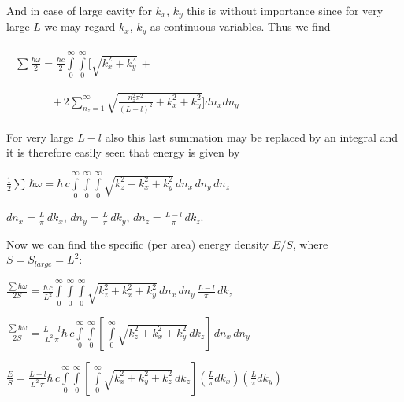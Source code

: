 \documentclass[twoside, 10pt]{article}
\begin{document}
\begin{multicols}{2}
    And in case of large cavity for \(k_x\), \(k_y\) this is without
importance since for very large \(L\) we may regard \(k_x\), \(k_y\) as
continuous variables. Thus we find

\(\begin{array}{l}
\begin{array}{ll}
\sum\frac{\hbar\omega}{2} = \frac{\hbar c}{2}\int\limits_{0}^{\infty}\int\limits_{0}^{\infty}\Bigg[\sqrt{k_x^2+k_y^2}\,+ & \,\\
\end{array} \\
\begin{array}{rr}
\,\,\,\,\,\,\,\,\,\,\,\,\,\,\,\, &+\, 2\sum\limits_{n_z=1}^{\infty}\sqrt{\frac{n_z^2 \pi^2}{(L-l)^2}+k_x^2+k_y^2}\Bigg]d{n_x}d{n_y}\end{array}
\end{array}\)


For very large \(L-l\) also this last summation may be replaced by an
integral and it is therefore easily seen that energy is given by

\(\frac{1}{2}\sum\,\hbar\omega = \hbar\,c\int\limits_{0}^{\infty}\int\limits_{0}^{\infty}\int\limits_{0}^{\infty}\sqrt{k_z^2+k_x^2+k_y^2}\,d{n_x}\,d{n_y}\,d{n_z}\)

\(dn_x = \frac{L}{\pi}\,dk_x\), \(dn_y = \frac{L}{\pi}\,dk_y\),
\(dn_z = \frac{L-l}{\pi}\,dk_z\).

    Now we can find the specific (per area) energy density \(E/S\), where
\(S = S_{large} = L^2\):

\(\frac{\sum\hbar\omega}{2 S} = \frac{\hbar\,c}{L^2}\int\limits_{0}^{\infty}\int\limits_{0}^{\infty}\int\limits_{0}^{\infty}\sqrt{k_z^2+k_x^2+k_y^2}\,dn_x\,dn_y\,\frac{L-l}{\pi}\,dk_z\)

\(\frac{\sum\hbar\omega}{2 S} = \frac{L-l}{L^2\,\pi}\hbar\,c\int\limits_{0}^{\infty}\int\limits_{0}^{\infty}\left[\,\int\limits_{0}^{\infty}\sqrt{k_z^2+k_x^2+k_y^2}\,dk_z\right]\,dn_x\,dn_y\)

\noindent
\(\frac{E}{S} = \frac{L-l}{L^2\,\pi}\hbar\,c\int\limits_{0}^{\infty}\int\limits_{0}^{\infty}\left[\,\int\limits_{0}^{\infty}\sqrt{k_x^2+k_y^2+k_z^2}\,dk_z\right] \left(\frac{L}{\pi}dk_x\right) \left(\frac{L}{\pi}dk_y\right)\)


\end{multicols}
\end{document}
